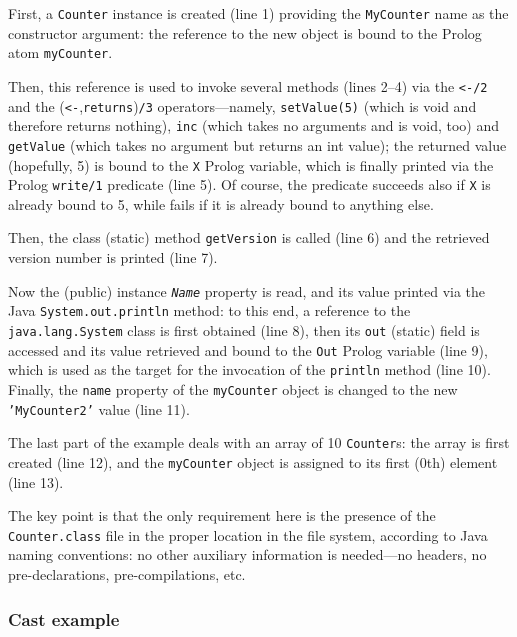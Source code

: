 First, a \texttt{Counter} instance is created (line 1) providing the \texttt{MyCounter} name as the constructor argument: the reference to the new object is bound to the Prolog atom \texttt{myCounter}.

Then, this reference is used to invoke several methods (lines 2--4) via the \verb|<-/2| and the (\verb|<-|,\texttt{returns})\texttt{/3} operators---namely, \texttt{setValue(5)} (which is void and therefore returns nothing), \texttt{inc} (which takes no arguments and is void, too) and \texttt{getValue} (which takes no argument but returns an int value);
the returned value (hopefully, 5) is bound to the \texttt{X} Prolog variable, which is finally printed via the Prolog \texttt{write/1} predicate (line 5).
%
Of course, the predicate succeeds also if \texttt{X} is already bound to 5, while fails if it is already bound to anything else.

Then, the class (static) method \texttt{getVersion} is called (line 6) and the retrieved version number is printed (line 7).

Now the (public) instance \textit{\texttt{Name}} property is read, and its value printed via the Java \texttt{System.out.println} method: to this end, a reference to the \texttt{java.lang.System} class is first obtained (line 8), then its \texttt{out} (static) field is accessed and its value retrieved and bound to the \texttt{Out} Prolog variable (line 9), which is used as the target for the invocation of the \texttt{println} method (line 10).
%
Finally, the \texttt{name} property of the \texttt{myCounter} object is changed to the new \texttt{'MyCounter2'} value (line 11).

The last part of the example deals with an array of 10 \texttt{Counter}s: the array is first created (line 12), and the \texttt{myCounter} object is assigned to its first (0th) element (line 13).

The key point is that the only requirement here is the presence of the \texttt{Counter.class} file in the proper location in the file system, according to Java naming conventions: no other auxiliary information is needed---no headers, no pre-declarations, pre-compilations, etc.

\subsubsection{Cast example}


